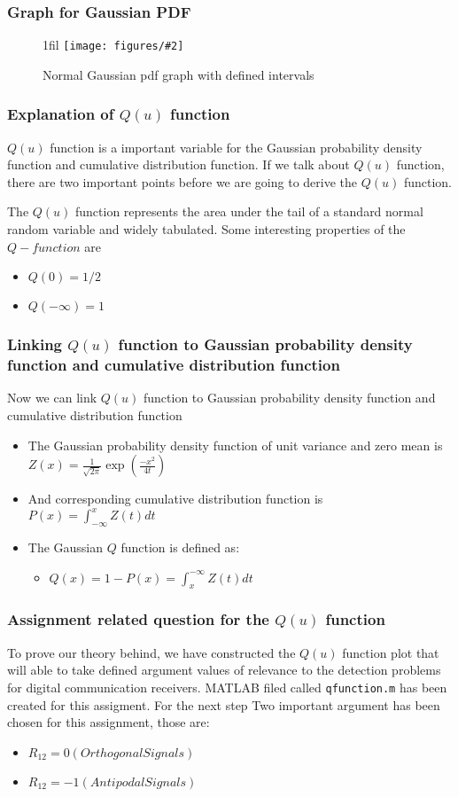 \documentclass{beamer}
\makeatletter
\newcommand{\code}[1]{\texttt{#1}}
\newcommand*{\centerfloat}{%
  \parindent \z@
  \leftskip \z@ \@plus 1fil \@minus \textwidth
  \rightskip\leftskip
  \parfillskip \z@skip}
\newcommand{\fig}[3]{
  \begin{figure}[H]
  \centerfloat
    \texttt{[image: figures/\#2]}
    \caption{#3}
  \end{figure}
}
\makeatother
\begin{document}
\begin{frame}
	\frametitle{Graph for Gaussian PDF}
\fig{5cm}{normalgaussiangraph.png}{Normal Gaussian pdf graph with defined intervals}
\end{frame}

\begin{frame}
	\frametitle{Explanation of $Q(u)$ function}
	$Q(u)$ function is a important variable for the Gaussian probability density function and cumulative distribution function. If we talk about $Q(u)$  function, there are two important points before we are going to derive the $Q(u)$ function.

	The $Q(u)$ function represents the area under the tail of a standard normal random variable and widely tabulated. Some interesting properties of the $Q- function$ are
	\begin{itemize}
		\item $Q(0)=1/2$
		\item $Q(-\infty)=1$
	\end{itemize}
\end{frame}
\begin{frame}
	\frametitle{Linking $Q(u)$ function to Gaussian probability density function and cumulative distribution function}
Now we can link $Q(u)$ function to Gaussian probability density function and cumulative distribution function
\begin{itemize}
	\item The Gaussian probability density function of unit variance and zero mean is $Z(x)=\frac{1}{\sqrt{2\pi}} \exp(\frac{-x^2}{4t})$
	\item And corresponding cumulative distribution function is $P(x)=\int_{-\infty}^{x} Z(t) dt$
	\item The Gaussian $Q$ function is defined as:
		\begin{itemize}
			\item $ Q(x) = 1-P(x)=\int_{x}^{-\infty} Z(t) dt$
		\end{itemize}
\end{itemize}
\end{frame}

\begin{frame}
	\frametitle{Assignment related question for the $Q(u)$ function}
To prove our theory behind, we have constructed the $Q(u)$ function plot that will able to take defined argument
values of relevance to the detection problems for digital communication receivers. MATLAB filed called \code{qfunction.m} has been created for this assigment. For the next step
Two important argument has been chosen for this assignment, those are:
	\begin{itemize}
		\item $R_12= 0 (Orthogonal Signals)$
		\item $R_12= -1( Antipodal Signals) $
	\end{itemize}
\end{frame}
\end{document}
